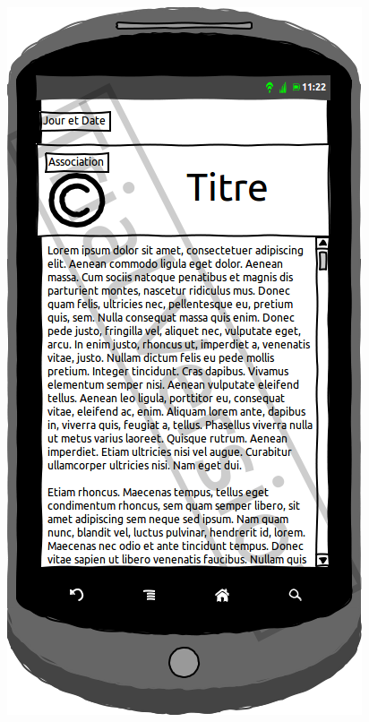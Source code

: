 \documentclass[a4paper, 11px]{article}
\begin{document}
\begin{figure}[htbp]
\begin{minipage}[c]{.50\linewidth}
		\begin{center}
			\includegraphics[scale=0.3]{../../Sketch/Android/DescrNews.png}
		\end{center}
	\end{minipage}
\end{figure}
\end{document}
